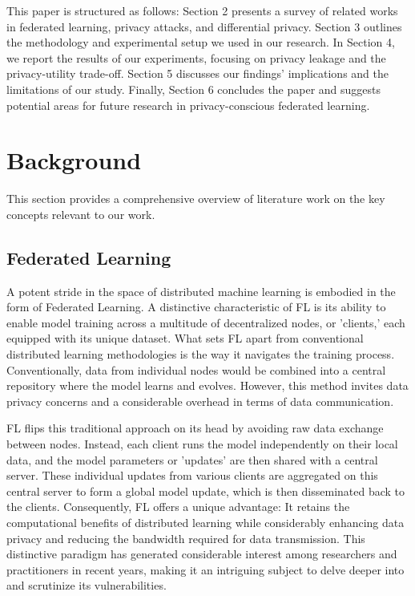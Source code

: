 This paper is structured as follows: Section 2 presents a survey of related works in federated learning, privacy attacks, and differential privacy. Section 3 outlines the methodology and experimental setup we used in our research. In Section 4, we report the results of our experiments, focusing on privacy leakage and the privacy-utility trade-off. Section 5 discusses our findings' implications and the limitations of our study. Finally, Section 6 concludes the paper and suggests potential areas for future research in privacy-conscious federated learning.

\section{Background}
This section provides a comprehensive overview of literature work on the key concepts relevant to our work. 

\subsection{Federated Learning}

A potent stride in the space of distributed machine learning is embodied in the form of Federated Learning. A distinctive characteristic of FL is its ability to enable model training across a multitude of decentralized nodes, or 'clients,' each equipped with its unique dataset. What sets FL apart from conventional distributed learning methodologies is the way it navigates the training process. Conventionally, data from individual nodes would be combined into a central repository where the model learns and evolves. However, this method invites data privacy concerns and a considerable overhead in terms of data communication.

FL flips this traditional approach on its head by avoiding raw data exchange between nodes. Instead, each client runs the model independently on their local data, and the model parameters or 'updates' are then shared with a central server. These individual updates from various clients are aggregated on this central server to form a global model update, which is then disseminated back to the clients. Consequently, FL offers a unique advantage: It retains the computational benefits of distributed learning while considerably enhancing data privacy and reducing the bandwidth required for data transmission. This distinctive paradigm has generated considerable interest among researchers and practitioners in recent years, making it an intriguing subject to delve deeper into and scrutinize its vulnerabilities.

